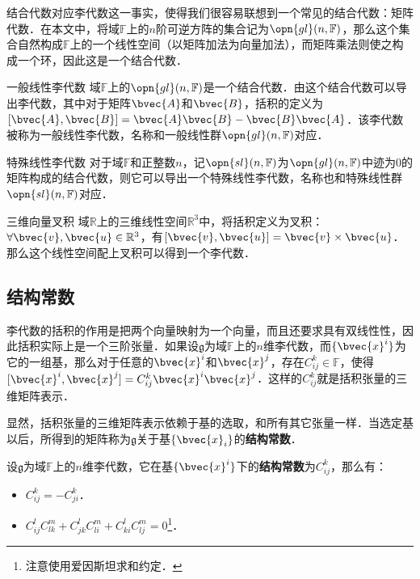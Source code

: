 结合代数对应李代数这一事实，使得我们很容易联想到一个常见的结合代数：矩阵代数．在本文中，将域$\mathbb{F}$上的$n$阶可逆方阵的集合记为$\opn{gl}(n, \mathbb{F})$，那么这个集合自然构成$\mathbb{F}$上的一个线性空间（以矩阵加法为向量加法），而矩阵乘法则使之构成一个环，因此这是一个结合代数．

\begin{example}{一般线性李代数}
域$\mathbb{F}$上的$\opn{gl}(n, \mathbb{F})$是一个结合代数．由这个结合代数可以导出李代数，其中对于矩阵$\bvec{A}$和$\bvec{B}$，括积的定义为$[\bvec{A}, \bvec{B}]=\bvec{A}\bvec{B}-\bvec{B}\bvec{A}$．该李代数被称为一般线性李代数，名称和一般线性群$\opn{gl}(n, \mathbb{F})$对应．
\end{example}

\begin{example}{特殊线性李代数}
对于域$\mathbb{F}$和正整数$n$，记$\opn{sl}(n, \mathbb{F})$为$\opn{gl}(n, \mathbb{F})$中迹为$0$的矩阵构成的结合代数，则它可以导出一个特殊线性李代数，名称也和特殊线性群$\opn{sl}(n, \mathbb{F})$对应．
\end{example}

\begin{example}{三维向量叉积}
域$\mathbb{R}$上的三维线性空间$\mathbb{R}^3$中，将括积定义为叉积：$\forall \bvec{v}, \bvec{u}\in \mathbb{R}^3$，有$[\bvec{v}, \bvec{u}]=\bvec{v}\times\bvec{u}$．那么这个线性空间配上叉积可以得到一个李代数．
\end{example}

\subsection{结构常数}

李代数的括积的作用是把两个向量映射为一个向量，而且还要求具有双线性性，因此括积实际上是一个三阶张量．如果设$\mathfrak{g}$为域$\mathbb{F}$上的$n$维李代数，而$\{\bvec{x}^i\}$为它的一组基，那么对于任意的$\bvec{x}^i$和$\bvec{x}^j$，存在$C^k_{ij}\in\mathbb{F}$，使得$[\bvec{x}^i, \bvec{x}^j]=C^k_{ij}\bvec{x}^i\bvec{x}^j$．这样的$C^k_{ij}$就是括积张量的三维矩阵表示．

显然，括积张量的三维矩阵表示依赖于基的选取，和所有其它张量一样．当选定基以后，所得到的矩阵称为$\mathfrak{g}$关于基$\{\bvec{x}_i\}$的\textbf{结构常数}．

\begin{theorem}{}\label{LieAlg_the1}
设$\mathfrak{g}$为域$\mathbb{F}$上的$n$维李代数，它在基$\{\bvec{x}^i\}$下的\textbf{结构常数}为$C^k_{ij}$，那么有：
\begin{itemize}
\item $C^k_{ij}=-C^k_{ji}$．
\item $C^l_{ij}C^m_{lk}+C^l_{jk}C^m_{li}+C^l_{ki}C^m_{lj}=0$\footnote{注意使用爱因斯坦求和约定．}．
\end{itemize}
\end{theorem}

